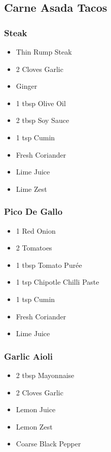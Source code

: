 \documentclass[11pt, english]{article}
\begin{document}
	\subsection{Carne Asada Tacos}

		\subsubsection*{Steak}

	\begin{itemize}
        \setlength\itemsep{0cm}
		\item Thin Rump Steak
		\item 2 Cloves Garlic
		\item Ginger
		\item 1 tbsp Olive Oil
		\item 2 tbsp Soy Sauce
		\item 1 tsp Cumin
		\item Fresh Coriander
		\item Lime Juice
		\item Lime Zest
	\end{itemize}

		\subsubsection*{Pico De Gallo}
	
	\begin{itemize}
        \setlength\itemsep{0cm}
                \item 1 Red Onion
		\item 2 Tomatoes
		\item 1 tbsp Tomato Pur\'{e}e
		\item 1 tsp Chipotle Chilli Paste
		\item 1 tsp Cumin
		\item Fresh Coriander
		\item Lime Juice
        \end{itemize}

		\subsubsection*{Garlic Aioli}

	\begin{itemize}
        \setlength\itemsep{0cm}
                \item 2 tbsp Mayonnaise
		\item 2 Cloves Garlic
		\item Lemon Juice
		\item Lemon Zest
		\item Coarse Black Pepper
        \end{itemize}
\end{document}
